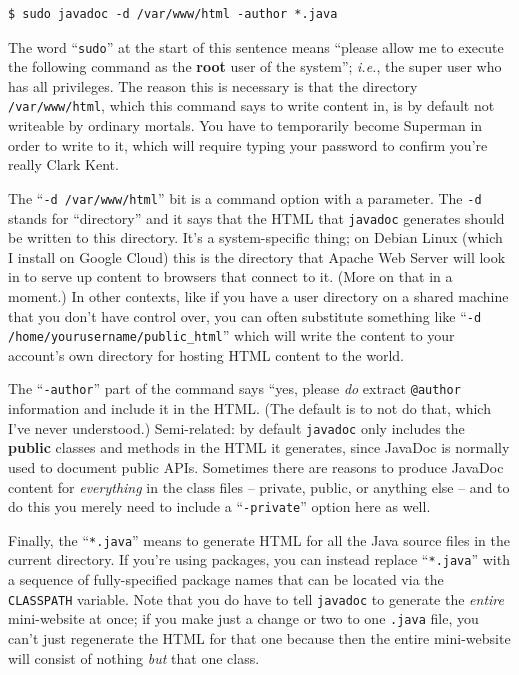 \begin{Verbatim}[fontsize=\small,samepage=true,frame=none]
$ sudo javadoc -d /var/www/html -author *.java
\end{Verbatim}

The word ``\texttt{sudo}'' at the start of this sentence means ``please allow
me to execute the following command as the \textbf{root} user of the system'';
\textit{i.e.}, the super user who has all privileges. The reason this is
necessary is that the directory \texttt{/var/www/html}, which this command
says to write content in, is by default not writeable by ordinary mortals. You
have to temporarily become Superman in order to write to it, which will
require typing your password to confirm you're really Clark Kent.

The ``\texttt{-d /var/www/html}'' bit is a command option with a parameter. The
\texttt{-d} stands for ``directory'' and it says that the HTML that
\texttt{javadoc} generates should be written to this directory. It's a
system-specific thing; on Debian Linux (which I install on Google Cloud) this
is the directory that Apache Web Server will look in to serve up content to
browsers that connect to it. (More on that in a moment.) In other contexts,
like if you have a user directory on a shared machine that you don't have
control over, you can often substitute something like ``\texttt{-d
/home/yourusername/public\_html}'' which will write the content to your
account's own directory for hosting HTML content to the world.

The ``\texttt{-author}'' part of the command says ``yes, please \textit{do}
extract \texttt{@author} information and include it in the HTML. (The default
is to not do that, which I've never understood.) Semi-related: by default
\texttt{javadoc} only includes the \textbf{public} classes and methods in the
HTML it generates, since JavaDoc is normally used to document public APIs.
Sometimes there are reasons to produce JavaDoc content for \textit{everything}
in the class files -- private, public, or anything else -- and to do this you
merely need to include a ``\texttt{-private}'' option here as well.

Finally, the ``\texttt{*.java}'' means to generate HTML for all the Java source
files in the current directory. If you're using packages, you can instead
replace ``\texttt{*.java}'' with a sequence of fully-specified package names
that can be located via the \texttt{CLASSPATH} variable. Note that you
do have to tell \texttt{javadoc} to generate the \textit{entire} mini-website
at once; if you make just a change or two to one \texttt{.java} file, you
can't just regenerate the HTML for that one because then the entire
mini-website will consist of nothing \textit{but} that one class.

